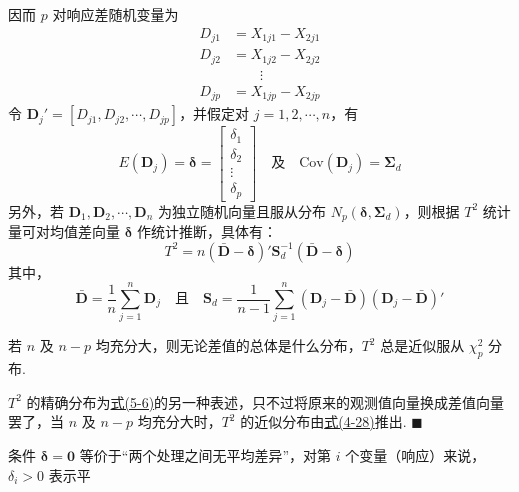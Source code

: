 因而 $p$ 对响应差随机变量为
\label{eq:6-5}
\begin{equation}
\begin{aligned}
D_{j1}&=X_{1j1}-X_{2j1}\\
D_{j2}&=X_{1j2}-X_{2j2}\\
&\qquad\vdots\\
D_{jp}&=X_{1jp}-X_{2jp}
\end{aligned}
\tag{6-5}
\end{equation}
令 $\mathbf{D}_j'=[D_{j1},D_{j2},\cdots,D_{jp}]$，并假定对 $j=1,2,\cdots,n$，有
\label{eq:6-6}
\begin{equation}
E(\mathbf{D}_j)=\boldsymbol{\delta}=\begin{bmatrix}\delta_1\\\delta_2\\\vdots\\\delta_p\end{bmatrix}\quad 及\quad \mathrm{Cov}(\mathbf{D}_j)=\boldsymbol{\Sigma}_d \tag{6-6}
\end{equation}
另外，若 $\mathbf{D}_1,\mathbf{D}_2,\cdots,\mathbf{D}_n$ 为独立随机向量且服从分布 $N_p(\boldsymbol{\delta},\boldsymbol{\Sigma}_d)$，则根据 $T^2$ 统计量可对均值差向量 $\boldsymbol{\delta}$ 作统计推断，具体有：
\label{eq:6-7}
\begin{equation}
T^2=n(\bar{\mathbf{D}}-\boldsymbol{\delta})'\mathbf{S}_d^{-1}(\bar{\mathbf{D}}-\boldsymbol{\delta}) \tag{6-7}
\end{equation}
其中，
\label{eq:6-8}
\begin{equation}
\bar{\mathbf{D}}=\frac{1}{n}\sum_{j=1}^n\mathbf{D}_j\quad 且\quad \mathbf{S}_d=\frac{1}{n-1}\sum_{j=1}^n(\mathbf{D}_j-\bar{\mathbf{D}})(\mathbf{D}_j-\bar{\mathbf{D}})' \tag{6-8}
\end{equation}


若 $n$ 及 $n-p$ 均充分大，则无论差值的总体是什么分布，$T^2$ 总是近似服从 $\chi_p^2$ 分布.

\quad $T^2$ 的精确分布为\hyperref[eq:5-6]{式(5-6)}的另一种表述，只不过将原来的观测值向量换成差值向量罢了，当 $n$ 及 $n-p$ 均充分大时，$T^2$ 的近似分布由\hyperref[eq:4-28]{式(4-28)}推出. \hfill$\blacksquare$

条件 $\boldsymbol{\delta}=\mathbf{0}$ 等价于“两个处理之间无平均差异”，对第 $i$ 个变量（响应）来说，$\delta_i>0$ 表示平

